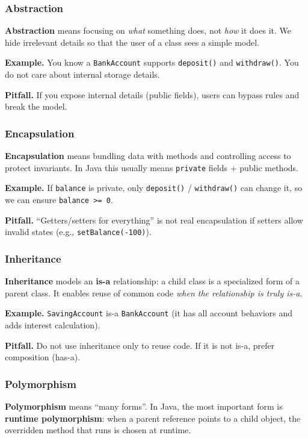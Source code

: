 \documentclass[11pt]{article}
\begin{document}
\subsubsection{Abstraction}
\textbf{Abstraction} means focusing on \emph{what} something does, not \emph{how} it does it.
We hide irrelevant details so that the user of a class sees a simple model.

\textbf{Example.} You know a \texttt{BankAccount} supports \texttt{deposit()} and \texttt{withdraw()}. You do not care about internal storage details.

\textbf{Pitfall.} If you expose internal details (public fields), users can bypass rules and break the model.

\subsubsection{Encapsulation}
\textbf{Encapsulation} means bundling data with methods and controlling access to protect invariants.
In Java this usually means \texttt{private} fields + public methods.

\textbf{Example.} If \texttt{balance} is private, only \texttt{deposit()} / \texttt{withdraw()} can change it, so we can ensure \texttt{balance >= 0}.

\textbf{Pitfall.} ``Getters/setters for everything'' is not real encapsulation if setters allow invalid states (e.g., \texttt{setBalance(-100)}).

\subsubsection{Inheritance}
\textbf{Inheritance} models an \textbf{is-a} relationship: a child class is a specialized form of a parent class.
It enables reuse of common code \emph{when the relationship is truly is-a}.

\textbf{Example.} \texttt{SavingAccount} is-a \texttt{BankAccount} (it has all account behaviors and adds interest calculation).

\textbf{Pitfall.} Do not use inheritance only to reuse code. If it is not is-a, prefer composition (has-a).

\subsubsection{Polymorphism}
\textbf{Polymorphism} means ``many forms''.
In Java, the most important form is \textbf{runtime polymorphism}:
when a parent reference points to a child object, the overridden method that runs is chosen at runtime.
\end{document}

